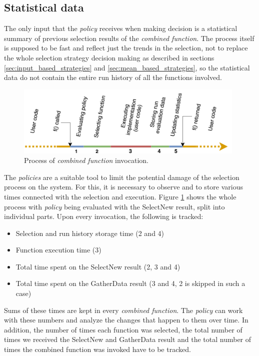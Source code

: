 \subsection{Statistical data}
\label{subsec:statistical_data}

The only input that the \textit{policy} receives when making decision is a statistical summary of previous selection results of the \textit{combined function}. The process itself is supposed to be fast and reflect just the trends in the selection, not to replace the whole selection strategy decision making as described in sections \ref{sec:input_based_strategies} and \ref{sec:mean_based_strategies}, so the statistical data do not contain the entire run history of all the functions involved.

\begin{figure}[h!]
	\captionsetup{justification=centering,margin=0.5cm}
	\centerline{\mbox{\includegraphics[width=110mm]{./img/run_schema.png}}}
	\caption{Process of \textit{combined function} invocation.}
	\label{fig:run_schema}
\end{figure}

The \textit{policies} are a suitable tool to limit the potential damage of the selection process on the system. For this, it is necessary to observe and to store various times connected with the selection and execution. Figure \ref{fig:run_schema} shows the whole process with \textit{policy} being evaluated with the SelectNew result, split into individual parts. Upon every invocation, the following is tracked:

\begin{itemize}
	\item Selection and run history storage time (2 and 4)
	\item Function execution time (3)
	\item Total time spent on the SelectNew result (2, 3 and 4)
	\item Total time spent on the GatherData result (3 and 4, 2 is skipped in such a case)
\end{itemize}

Sums of these times are kept in every \textit{combined function}. The \textit{policy} can work with these numbers and analyze the changes that happen to them over time. In addition, the number of times each function was selected, the total number of times we received the SelectNew and GatherData result and the total number of times the combined function was invoked have to be tracked. 

